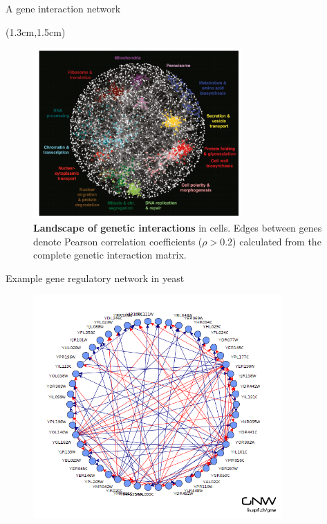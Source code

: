 \documentclass[aspectratio=1610]{beamer}					%
\begin{document}
\begin{frame}{A gene interaction network}
\begin{center}
\begin{textblock*}{13cm}(1.3cm,1.5cm)
\begin{figure}
\includegraphics[width=8cm]{gene-network.png}
\caption{\textbf{Landscape of genetic interactions} in cells. Edges between genes denote Pearson correlation coefficients ($\rho > 0.2$) calculated from the
complete genetic interaction matrix.}
\end{figure}
\end{textblock*}
\end{center}
\end{frame}


\begin{frame}{Example gene regulatory network in yeast}

\begin{figure}
\includegraphics[width=9.5cm]{yeast-net.png}
\end{figure}

\end{frame}
\end{document}
